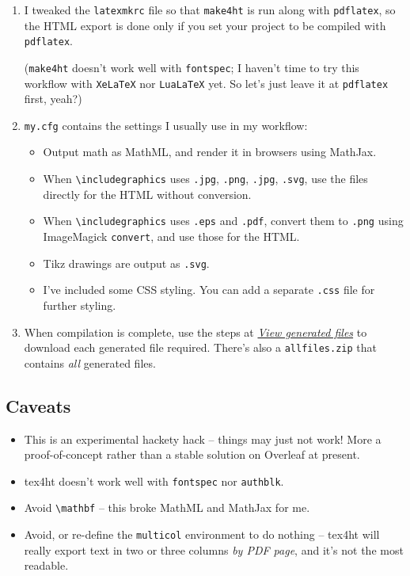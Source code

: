 \documentclass[graybox]{svmult}
\begin{document}
\begin{enumerate}
\item I tweaked the \verb|latexmkrc| file so that \verb|make4ht| is run along with \verb|pdflatex|, so the HTML export is done only if you set your project to be compiled with \verb|pdflatex|.

(\verb|make4ht| doesn't work well with \verb|fontspec|; I haven't time to try this workflow with \verb|XeLaTeX| nor \verb|LuaLaTeX| yet. So let's just leave it at \verb|pdflatex| first, yeah?)

\item \verb|my.cfg| contains the settings I usually use in my workflow:
  \begin{itemize}
  \item Output math as MathML, and render it in browsers using MathJax.
  \item When \verb|\includegraphics| uses \verb|.jpg|, \verb|.png|, \verb|.jpg|, \verb|.svg|, use the files directly for the HTML without conversion.
  \item When \verb|\includegraphics| uses \verb|.eps| and \verb|.pdf|, convert them to \verb|.png| using ImageMagick \verb|convert|, and use those for the HTML.

  \item Tikz drawings are output as \verb|.svg|.
  
  \item I've included some CSS styling. You can add a separate \verb|.css| file for further styling.
  \end{itemize}
  
\item When compilation is complete, use the steps at \href{https://www.overleaf.com/learn/how-to/View_generated_files}{\emph{View generated files}} to download each generated file required. There's also a \texttt{allfiles.zip} that contains \emph{all} generated files.
\end{enumerate}

\subsection{Caveats}

\begin{itemize}
\item This is an experimental hackety hack -- things may just not work! More a proof-of-concept rather than a stable solution on Overleaf at present.
\item tex4ht doesn't work well with \verb|fontspec| nor \verb|authblk|.
\item Avoid \verb|\mathbf| -- this broke MathML and MathJax for me.
\item Avoid, or re-define the \verb|multicol| environment to do nothing -- tex4ht will really export text in two or three columns \emph{by PDF page}, and it's not the most readable.
\end{itemize}
\end{document}
